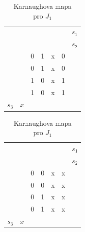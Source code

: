 \begin{table}[!h]
\begin{minipage}{.5\linewidth}
      \caption{Karnaughova mapa\\ pro Y}
      \centering
    \begin{tabular}{lllllll}
      			       &       					 &       				 & &	\colorbox{yellow}{}& \colorbox{yellow}{}         &$s_1$ \\
    		 	       &        					&        & \colorbox{red}{}    & \colorbox{red}{}				      &         &$s_2$     \\
    		 	       &        					& 0    				 & 1    				   & x     				& 0       &  \\
              	       & \colorbox{black}{}       & 0     				 & 1    				   & x   		  			& 0       &  \\
\colorbox{blue}{}& \colorbox{black}{}       & 1    				 & 0     				   & x     				& 1       &  \\
\colorbox{blue}{}&       					 & 1   				 & 0				  	   & x    					& 1       &  \\
    	  $ s_3$ 	& $x$  					&     				 &       				   &       				  	 &          &  \\
    \end{tabular}%
  \end{minipage}%
    \begin{minipage}{.5\linewidth}
      \centering
        \caption{Karnaughova mapa\\ pro $J_1$}
    \begin{tabular}{lllllll}
      			       &       					 &       				 &  &	\colorbox{yellow}{}&  \colorbox{yellow}{}       &$s_1$ \\
    		 	       &        					&        & \colorbox{red}{}    & \colorbox{red}{}				      &         &$s_2$     \\
    		 	       &        					& 0    				 & 0    				   & x     				& x       &  \\
              	       & \colorbox{black}{}       & 0     				 & 0    				   & x   		  			& x       &  \\
\colorbox{blue}{}& \colorbox{black}{}       & 0    				 & 1     				   & x     				& x       &  \\
\colorbox{blue}{}&       					 & 0   				 & 1				  	   & x    					& x       &  \\
    	  $ s_3$ 	& $x$  					&     				 &       				   &       				  	 &          &  \\
    \end{tabular}%
  \end{minipage} 

   
  \label{tab:addlabel}%
\end{table}%

